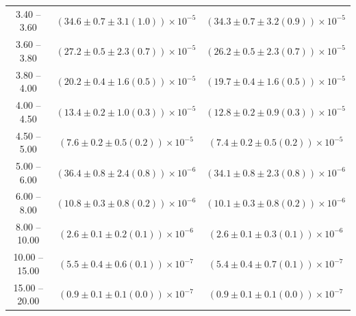 \begin{table}
\begin{center}
\begin{tabular}{ c | c c }
3.40 -- 3.60 & $(34.6\pm0.7\pm3.1(1.0))\times10^{-5}$ & $(34.3\pm0.7\pm3.2(0.9))\times10^{-5}$ \\ 
3.60 -- 3.80 & $(27.2\pm0.5\pm2.3(0.7))\times10^{-5}$ & $(26.2\pm0.5\pm2.3(0.7))\times10^{-5}$ \\ 
3.80 -- 4.00 & $(20.2\pm0.4\pm1.6(0.5))\times10^{-5}$ & $(19.7\pm0.4\pm1.6(0.5))\times10^{-5}$ \\ 
4.00 -- 4.50 & $(13.4\pm0.2\pm1.0(0.3))\times10^{-5}$ & $(12.8\pm0.2\pm0.9(0.3))\times10^{-5}$ \\ 
4.50 -- 5.00 & $(7.6\pm0.2\pm0.5(0.2))\times10^{-5}$ & $(7.4\pm0.2\pm0.5(0.2))\times10^{-5}$ \\ 
5.00 -- 6.00 & $(36.4\pm0.8\pm2.4(0.8))\times10^{-6}$ & $(34.1\pm0.8\pm2.3(0.8))\times10^{-6}$ \\ 
6.00 -- 8.00 & $(10.8\pm0.3\pm0.8(0.2))\times10^{-6}$ & $(10.1\pm0.3\pm0.8(0.2))\times10^{-6}$ \\ 
8.00 -- 10.00 & $(2.6\pm0.1\pm0.2(0.1))\times10^{-6}$ & $(2.6\pm0.1\pm0.3(0.1))\times10^{-6}$ \\ 
10.00 -- 15.00 & $(5.5\pm0.4\pm0.6(0.1))\times10^{-7}$ & $(5.4\pm0.4\pm0.7(0.1))\times10^{-7}$ \\ 
15.00 -- 20.00 & $(0.9\pm0.1\pm0.1(0.0))\times10^{-7}$ & $(0.9\pm0.1\pm0.1(0.0))\times10^{-7}$ \\ 
\hline
\end{tabular}
\end{center}
\end{table}
 
